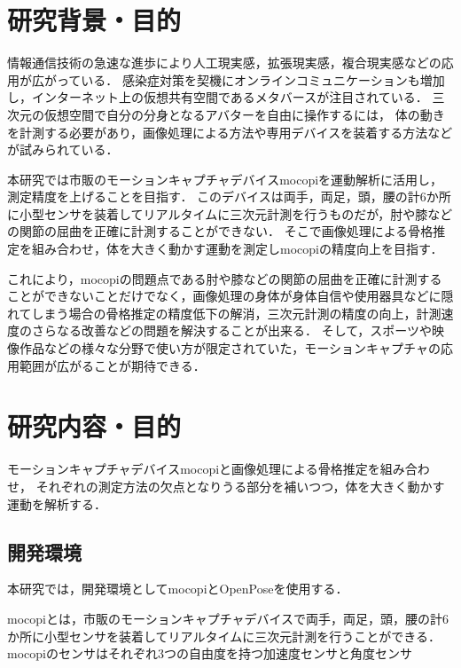 \documentclass[titlepage]{jarticle}
\begin{document}
\maketitle

%
%
\section{研究背景・目的}
%
情報通信技術の急速な進歩により人工現実感，拡張現実感，複合現実感などの応用が広がっている．
感染症対策を契機にオンラインコミュニケーションも増加し，インターネット上の仮想共有空間であるメタバースが注目されている．
三次元の仮想空間で自分の分身となるアバターを自由に操作するには，
体の動きを計測する必要があり，画像処理による方法や専用デバイスを装着する方法などが試みられている．

本研究では市販のモーションキャプチャデバイスmocopiを運動解析に活用し，測定精度を上げることを目指す．
このデバイスは両手，両足，頭，腰の計6か所に小型センサを装着してリアルタイムに三次元計測を行うものだが，肘や膝などの関節の屈曲を正確に計測することができない．
そこで画像処理による骨格推定を組み合わせ，体を大きく動かす運動を測定しmocopiの精度向上を目指す．

これにより，mocopiの問題点である肘や膝などの関節の屈曲を正確に計測することができないことだけでなく，画像処理の身体が身体自信や使用器具などに隠れてしまう場合の骨格推定の精度低下の解消，三次元計測の精度の向上，計測速度のさらなる改善などの問題を解決することが出来る．
そして，スポーツや映像作品などの様々な分野で使い方が限定されていた，モーションキャプチャの応用範囲が広がることが期待できる．
%
%
\section{研究内容・目的}
%
モーションキャプチャデバイスmocopiと画像処理による骨格推定を組み合わせ，
それぞれの測定方法の欠点となりうる部分を補いつつ，体を大きく動かす運動を解析する．
%
%
\subsection{開発環境}
%
本研究では，開発環境としてmocopiとOpenPoseを使用する．

mocopi\cite{mocopi}とは，市販のモーションキャプチャデバイスで両手，両足，頭，腰の計6か所に小型センサを装着してリアルタイムに三次元計測を行うことができる．
mocopiのセンサはそれぞれ3つの自由度を持つ加速度センサと角度センサ
\end{document}
